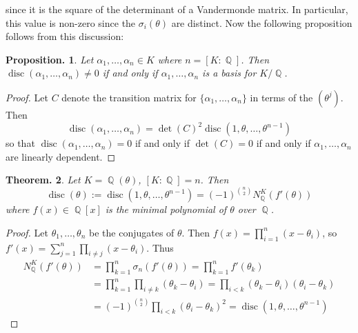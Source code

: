 \documentclass[11pt, a4paper]{memoir}
\DeclareMathOperator{\Q}{{\mathbb{Q}}}
\theoremstyle{change}
\newtheorem{theorem}{Theorem.}[section]
\newtheorem{proposition}[theorem]{Proposition.}
\theoremstyle{plain}
\theoremstyle{nonumberplain}
\newtheorem{proof}{Proof}
\DeclareMathOperator{\disc}{disc}
\numberwithin{equation}{section}
\begin{document}
since it is the square of the determinant of a Vandermonde matrix.
In particular, this value is non-zero since the $\sigma_i(\theta)$ are distinct.
Now the following proposition follows from this discussion:
\begin{proposition}
    Let $\alpha_1,\ldots,\alpha_n\in K$ where $n=[K:\Q]$.
    Then $\disc(\alpha_1,\ldots,\alpha_n)\neq 0$ if and only if $\alpha_1,\ldots,\alpha_n$ is a basis for $K/\Q$.
\end{proposition}
\begin{proof}
    Let $C$ denote the transition matrix for $\{\alpha_1,\ldots,\alpha_n\}$ in terms of the $(\theta^j)$.
    Then
    \begin{equation*}
        \disc(\alpha_1,\ldots,\alpha_n)=\det(C)^2\disc(1,\theta,\ldots,\theta^{n-1})
    \end{equation*}
    so that $\disc(\alpha_1,\ldots,\alpha_n)=0$ if and only if $\det(C)=0$ if and only if $\alpha_1,\ldots,\alpha_n$ are linearly dependent.
\end{proof}
\begin{theorem}\label{t:disc-pb}
    Let $K=\Q(\theta)$, $[K:\Q]=n$.
    Then
    \begin{equation*}
        \disc(\theta):=\disc(1,\theta,\ldots,\theta^{n-1})=(-1)^{\binom{n}{2}}N_{\Q}^K(f'(\theta))
    \end{equation*}
    where $f(x)\in\Q[x]$ is the minimal polynomial of $\theta$ over $\Q$.
\end{theorem}
\begin{proof}
    Let $\theta_1,\ldots,\theta_n$ be the conjugates of $\theta$.
    Then $f(x)=\prod_{i=1}^n(x-\theta_i)$, so $f'(x)=\sum_{j=1}^n\prod_{i\neq j}(x-\theta_i)$.
    Thus
    \begin{align*}
        N_{\Q}^K(f'(\theta))&=\prod_{k=1}^n\sigma_n(f'(\theta)) = \prod_{k=1}^n f'(\theta_k)\\
                            &= \prod_{k=1}^n\prod_{i\neq k}(\theta_k-\theta_i)= \prod_{i<k}(\theta_k-\theta_i)(\theta_i-\theta_k)\\
                            &= (-1)^{\binom{n}{2}}\prod_{i<k}(\theta_i-\theta_k)^2= \disc(1,\theta,\ldots,\theta^{n-1})
    \end{align*}
\end{proof}
\end{document}
